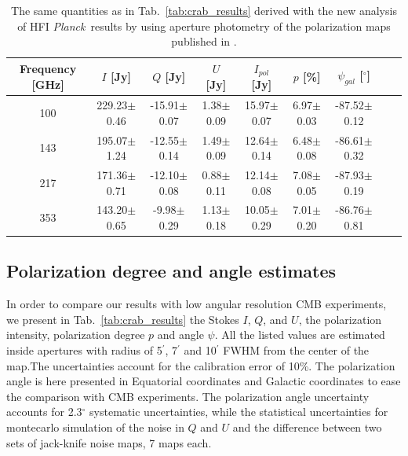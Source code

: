 \documentclass[twocolumn,traditabstract]{aa}
\def\Planck{\textit{Planck}}
\begin{document}
 \begin{table}[h!]
  \centering
      \begin{tabular}{ccccccccc}
      \hline
      \hline
       Frequency [GHz] & \small $I$ [Jy] & \small $Q$ [Jy] & \small $U$ [Jy] & \small $I_{pol}$ [Jy] & \small $p$ [\%] & \small $\psi_{gal}$ [$^\circ$] \\
      \hline

\small 100 & \small 229.23$\pm$0.46  & \small -15.91$\pm$0.07 & \small 1.38$\pm$0.09 & \small 15.97$\pm$0.07 & \small 6.97$\pm$0.03 & \small -87.52$\pm$0.12  \\ 
\small 143 & \small 195.07$\pm$1.24  & \small -12.55$\pm$0.14 & \small 1.49$\pm$0.09 & \small 12.64$\pm$0.14 & \small 6.48$\pm$0.08 & \small -86.61$\pm$0.32  \\
\small 217 & \small 171.36$\pm$0.71  & \small -12.10$\pm$0.08 & \small 0.88$\pm$0.11 & \small 12.14$\pm$0.08 & \small 
7.08$\pm$0.05 & \small -87.93$\pm$0.19  \\
\small 353 & \small 143.20$\pm$0.65  & \small -9.98$\pm$0.29 & \small 1.13$\pm$0.18 & \small 10.05$\pm$0.29 & \small 7.01$\pm$0.20 & \small -86.76$\pm$0.81 \\
    \hline            
    \hline   
    \end{tabular}
   \caption{The same quantities as in Tab.~\ref{tab:crab_results} derived with the new analysis of HFI \Planck\ results by using aperture photometry of the polarization maps published in \cite{refId0}.}
    \label{tab:planck_results}
 \end{table}



\subsection{Polarization degree and angle estimates}
In order to compare our results with low angular resolution CMB experiments, we present in Tab.~\ref{tab:crab_results} the Stokes $I$, $Q$, and $U$, the polarization intensity, polarization degree $p$ and angle $\psi$. All the listed values are estimated inside apertures with radius of 5$^\prime$, 7$^\prime$ and 10$^\prime$ FWHM from the center of the map.The uncertainties account for the calibration error of 10\%. 
The polarization angle is here presented in Equatorial coordinates and Galactic coordinates to ease the comparison with CMB experiments.
The polarization angle uncertainty accounts for 2.3$^{\circ}$ systematic uncertainties, while the statistical uncertainties for montecarlo simulation of the noise in $Q$ and $U$ and the difference between two sets of jack-knife noise maps, 7 maps each.
\end{document}
